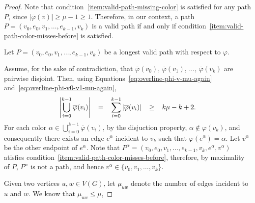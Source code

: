 \begin{proof}
    Note that condition~\ref{item:valid-path-missing-color} is satisfied for any path \(P\),
    since \(|\overline\varphi(v)| \geq \mu - 1 \geq 1\).
    Therefore, in our context,
    a path \(P = (v_0, e_0, v_1, \dots, e_{k-1}, v_k)\) is a valid path
    if and only if
    condition~\ref{item:valid-path-color-misses-before} is satisfied.

    Let \(P = (v_0, e_0, v_1, \dots, e_{k-1}, v_k)\) be
    a longest valid path with respect to \(\varphi\).

    Assume,
    for the sake of contradiction, that
    \(\overline\varphi(v_0)\),
    \(\overline\varphi(v_1)\),
    \(\dots\),
    \(\overline\varphi(v_k)\)
    are pairwise disjoint.
    Then, using Equations~\eqref{eq:overline-phi-v-mu-again} and~\eqref{eq:overline-phi-v0-v1-mu-again},
    \begin{equation}
        \thickmuskip=20mu
        \left| \bigcup_{i=0}^{k-1} \overline\varphi(v_i) \right|
        = \sum_{i=0}^{k-1} |\overline\varphi(v_i)|
        \geq k\mu - k + 2.
    \end{equation}
    For each color \(\alpha \in \bigcup_{i=0}^{k-1} \overline\varphi(v_i)\),
    by the disjuction property, \(\alpha \notin \varphi(v_k)\),
    and consequently
    there exists an edge \(e^{\alpha}\) incident to \(v_k\)
    such that \(\varphi(e^{\alpha}) = \alpha\).
    Let \(v^{\alpha}\) be the other endpoint of \(e^{\alpha}\).
    Note that \(P^{\alpha} = (v_0, e_0, v_1, \dots, e_{k-1}, v_k, e^{\alpha}, v^{\alpha})\)
    atisfies condition~\ref{item:valid-path-color-misses-before},
    therefore, by maximality of \(P\),
    \(P^{\alpha}\) is not a path,
    and hence \(v^{\alpha} \in \{v_0, v_1, \dots, v_k\}\).

    Given two vertices \(u, w \in V(G)\),
    let \(\mu_{uw}\) denote the number of edges incident to \(u\) and \(w\).
    We know that \(\mu_{uw} \leq \mu\),


\end{proof}
